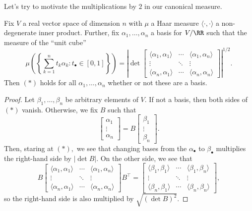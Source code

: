 Let's try to motivate the multiplications by $2$ in our canonical measure.
\begin{lemma} \label{lem:detisvol}
    Fix $V$ a real vector space of dimension $n$ with $\mu$ a Haar measure $\langle\cdot,\cdot\rangle$ a non-degenerate inner product. Further, fix $\alpha_1,\ldots,\alpha_n$ a basis for $V/\RR$ such that the measure of the ``unit cube''
    \[\mu\left(\left\{\sum_{k=1}^n t_k\alpha_k:t_\bullet\in[0,1]\right\}\right)=\left|\det\begin{bmatrix}
        \langle\alpha_1,\alpha_1\rangle & \cdots & \langle\alpha_1,\alpha_n\rangle \\
        \vdots & \ddots & \vdots \\
        \langle\alpha_n,\alpha_1\rangle & \cdots & \langle\alpha_n,\alpha_n\rangle
    \end{bmatrix}\right|^{1/2}.\tag{$*$}\]
    Then $(*)$ holds for all $\alpha_1,\ldots,\alpha_n$ whether or not these are a basis.
\end{lemma}
\begin{proof}
    Let $\beta_1,\ldots,\beta_n$ be arbitrary elements of $V.$ If not a basis, then both sides of $(*)$ vanish. Otherwise, we fix $B$ such that
    \[\begin{bmatrix}\alpha_1 \\ \vdots \\ \alpha_n\end{bmatrix} = B\begin{bmatrix}\beta_1 \\ \vdots \\ \beta_n \end{bmatrix}.\]
    Then, staring at $(*),$ we see that changing bases from the $\alpha_\bullet$ to $\beta_\bullet$ multiplies the right-hand side by $|\det B|.$ On the other side, we see that
    \[B\begin{bmatrix}
        \langle\alpha_1,\alpha_1\rangle & \cdots & \langle\alpha_1,\alpha_n\rangle \\
        \vdots & \ddots & \vdots \\
        \langle\alpha_n,\alpha_1\rangle & \cdots & \langle\alpha_n,\alpha_n\rangle
    \end{bmatrix}B^\intercal=\begin{bmatrix}
        \langle\beta_1,\beta_1\rangle & \cdots & \langle\beta_1,\beta_n\rangle \\
        \vdots & \ddots & \vdots \\
        \langle\beta_n,\beta_1\rangle & \cdots & \langle\beta_n,\beta_n\rangle
    \end{bmatrix},\]
    so the right-hand side is also multiplied by $\sqrt{(\det B)^2}.$
\end{proof}
